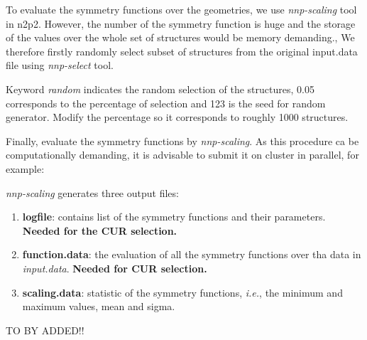 \documentclass[12pt]{article}
\begin{document}
To evaluate the symmetry functions over the geometries, we use \textit{nnp-scaling} tool in n2p2. However, the number of the symmetry function is huge and the storage of the values over the whole set of structures would be memory demanding., We therefore firstly randomly select subset of structures from the original input.data file using \textit{nnp-select} tool.

\begin{center}
\end{center}

Keyword \textit{random} indicates the random selection of the structures, 0.05 corresponds to the percentage of selection and 123 is the seed for random generator. Modify the percentage so it corresponds to roughly 1000 structures.

Finally, evaluate the symmetry functions by \textit{nnp-scaling}. As this procedure ca be computationally demanding, it is advisable to submit it on cluster in parallel, for example:

\begin{center}
\end{center}


\textit{nnp-scaling} generates three output files:
\begin{enumerate}
    \item \textbf{logfile}: contains list of the symmetry functions and their parameters. \textbf{Needed for the CUR selection.}
    \item \textbf{function.data}: the evaluation of all the symmetry functions over tha data in \textit{input.data}. \textbf{Needed for CUR selection.}
    \item \textbf{scaling.data}: statistic of the symmetry functions, \textit{i.e.}, the minimum and maximum values, mean and sigma.
\end{enumerate}

TO BY ADDED!!
\end{document}
